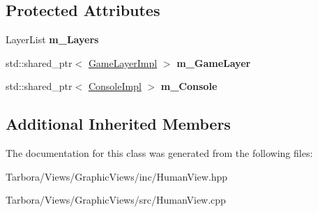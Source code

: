 \subsection*{Protected Attributes}
\begin{DoxyCompactItemize}
\item 
\mbox{\label{classTarbora_1_1HumanView_a09f3664c6d9e79bc83054fd3df4bfa2e}} 
Layer\+List {\bfseries m\+\_\+\+Layers}
\item 
\mbox{\label{classTarbora_1_1HumanView_a84ed6acc11ef03f73edae504611d8c8e}} 
std\+::shared\+\_\+ptr$<$ \hyperlink{classTarbora_1_1GameLayerImpl}{Game\+Layer\+Impl} $>$ {\bfseries m\+\_\+\+Game\+Layer}
\item 
\mbox{\label{classTarbora_1_1HumanView_abab13590317db3cfc0b35d425ae039aa}} 
std\+::shared\+\_\+ptr$<$ \hyperlink{classTarbora_1_1ConsoleImpl}{Console\+Impl} $>$ {\bfseries m\+\_\+\+Console}
\end{DoxyCompactItemize}
\subsection*{Additional Inherited Members}


The documentation for this class was generated from the following files\+:\begin{DoxyCompactItemize}
\item 
Tarbora/\+Views/\+Graphic\+Views/inc/Human\+View.\+hpp\item 
Tarbora/\+Views/\+Graphic\+Views/src/Human\+View.\+cpp\end{DoxyCompactItemize}
